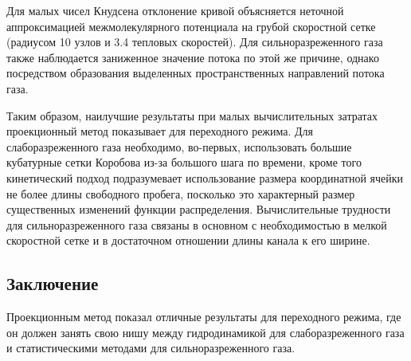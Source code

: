 \documentclass[english,russian,a4paper,12pt]{article}
\begin{document}
Для малых чисел Кнудсена отклонение кривой объясняется неточной аппроксимацией межмолекулярного потенциала
на грубой скоростной сетке (радиусом 10 узлов и 3.4 тепловых скоростей).
Для сильноразреженного газа также наблюдается заниженное значение потока по этой же причине,
однако посредством образования выделенных пространственных направлений потока газа.

Таким образом, наилучшие результаты при малых вычислительных затратах проекционный метод показывает для переходного режима.
Для слаборазреженного газа необходимо, во-первых, использовать большие кубатурные сетки Коробова из-за большого шага по времени,
кроме того кинетический подход подразумевает использование размера координатной ячейки не более длины свободного пробега,
посколько это характерный размер существенных изменений функции распределения.
Вычислительные трудности для сильноразреженного газа связаны в основном с необходимостью в мелкой скоростной сетке
и в достаточном отношении длины канала к его ширине.

\subsection{Заключение}

Проекционным метод показал отличные результаты для переходного режима,
где он должен занять свою нишу между гидродинамикой для слаборазреженного газа
и статистическими методами для сильноразреженного газа.




\printbibliography
\end{document}

